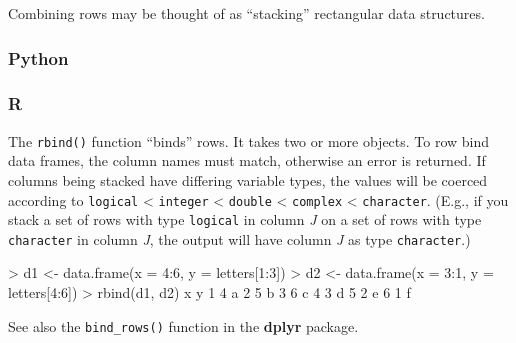 \documentclass[
]{book}
\newenvironment{Shaded}{\begin{snugshade}}{\end{snugshade}}
\newcommand{\AttributeTok}[1]{\textcolor[rgb]{0.77,0.63,0.00}{#1}}
\newcommand{\DecValTok}[1]{\textcolor[rgb]{0.00,0.00,0.81}{#1}}
\newcommand{\FunctionTok}[1]{\textcolor[rgb]{0.00,0.00,0.00}{#1}}
\newcommand{\NormalTok}[1]{#1}
\newcommand{\OtherTok}[1]{\textcolor[rgb]{0.56,0.35,0.01}{#1}}
\newcommand{\SpecialCharTok}[1]{\textcolor[rgb]{0.00,0.00,0.00}{#1}}
\begin{document}
Combining rows may be thought of as ``stacking'' rectangular data structures.

\hypertarget{python-28}{%
\subsubsection*{Python}\label{python-28}}

\hypertarget{r-28}{%
\subsubsection*{R}\label{r-28}}

The \texttt{rbind()} function ``binds'' rows. It takes two or more objects. To row bind data frames, the column names must match, otherwise an error is returned. If columns being stacked have differing variable types, the values will be coerced according to \texttt{logical} \textless{} \texttt{integer} \textless{} \texttt{double} \textless{} \texttt{complex} \textless{} \texttt{character}. (E.g., if you stack a set of rows with type \texttt{logical} in column \emph{J} on a set of rows with type \texttt{character} in column \emph{J}, the output will have column \emph{J} as type \texttt{character}.)

\begin{Shaded}
\begin{Highlighting}[]
\SpecialCharTok{\textgreater{}}\NormalTok{ d1 }\OtherTok{\textless{}{-}} \FunctionTok{data.frame}\NormalTok{(}\AttributeTok{x =} \DecValTok{4}\SpecialCharTok{:}\DecValTok{6}\NormalTok{, }\AttributeTok{y =}\NormalTok{ letters[}\DecValTok{1}\SpecialCharTok{:}\DecValTok{3}\NormalTok{])}
\SpecialCharTok{\textgreater{}}\NormalTok{ d2 }\OtherTok{\textless{}{-}} \FunctionTok{data.frame}\NormalTok{(}\AttributeTok{x =} \DecValTok{3}\SpecialCharTok{:}\DecValTok{1}\NormalTok{, }\AttributeTok{y =}\NormalTok{ letters[}\DecValTok{4}\SpecialCharTok{:}\DecValTok{6}\NormalTok{])}
\SpecialCharTok{\textgreater{}} \FunctionTok{rbind}\NormalTok{(d1, d2)}
\NormalTok{  x y}
\DecValTok{1} \DecValTok{4}\NormalTok{ a}
\DecValTok{2} \DecValTok{5}\NormalTok{ b}
\DecValTok{3} \DecValTok{6}\NormalTok{ c}
\DecValTok{4} \DecValTok{3}\NormalTok{ d}
\DecValTok{5} \DecValTok{2}\NormalTok{ e}
\DecValTok{6} \DecValTok{1}\NormalTok{ f}
\end{Highlighting}
\end{Shaded}

See also the \texttt{bind\_rows()} function in the \textbf{dplyr} package.
\end{document}
